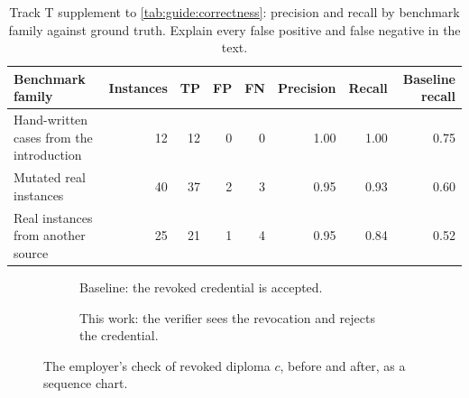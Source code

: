 \begin{table}[!ht]
  \centering
  \caption{Track T supplement to \cref{tab:guide:correctness}: precision and recall by benchmark family against ground truth. Explain every false positive and false negative in the text.}
  \label{tab:guide:precision}
  {\small
  \begin{tabularx}{\linewidth}{>{\raggedright\arraybackslash}X r r r r r r r}
    \toprule
    \textbf{Benchmark family} & \textbf{Instances} & \textbf{TP} & \textbf{FP} & \textbf{FN} & \textbf{Precision} & \textbf{Recall} & \textbf{Baseline recall} \\
    \midrule
    Hand-written cases from the introduction & 12 & 12 & 0 & 0 & 1.00 & 1.00 & 0.75 \\
    Mutated real instances & 40 & 37 & 2 & 3 & 0.95 & 0.93 & 0.60 \\
    Real instances from another source & 25 & 21 & 1 & 4 & 0.95 & 0.84 & 0.52 \\
    \bottomrule
  \end{tabularx}
  }
\end{table}

\begin{figure}[!ht]
  \centering
  \newcommand{\lifelines}{%
    \foreach \x/\n in {0/Issuer, 2.3/Holder, 4.6/Verifier, 6.9/Registry} {%
      \node[role] at (\x, 0) {\n}; \draw[lifeline] (\x, -0.3) -- (\x, -3.4);}%
    \draw[msg] (0, -0.8) -- node[above] {issue $c$} (2.3, -0.8);
    \draw[msg] (0, -1.4) -- node[above, pos=0.82] {revoke $c$} (6.9, -1.4);
    \draw[msg] (2.3, -2.0) -- node[above] {present $c$} (4.6, -2.0);}
  \begin{subfigure}[b]{0.49\linewidth}
    \centering
    \caption{Baseline: the revoked credential is accepted.}\label{fig:guide:example-trace-baseline}
  \end{subfigure}\hfill
  \begin{subfigure}[b]{0.49\linewidth}
    \centering
    \caption{This work: the verifier sees the revocation and rejects the credential.}\label{fig:guide:example-trace-ours}
  \end{subfigure}
  \caption{The employer's check of revoked diploma $c$, before and after, as a sequence chart.}
  \label{fig:guide:example-trace}
\end{figure}

